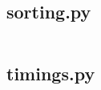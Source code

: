 \documentclass[12pt]{article}
\begin{document}
        \subsection{sorting.py}
        \label{file:sorting}
        \inputminted[python3, linenos, breaklines, frame=lines, fontsize=\footnotesize]{python}{sorting.py}

    \newpage

        \subsection{timings.py}
        \label{file:timing}
        \inputminted[python3, linenos, breaklines, frame=lines, fontsize=\footnotesize]{python}{timings.py}
\end{document}
